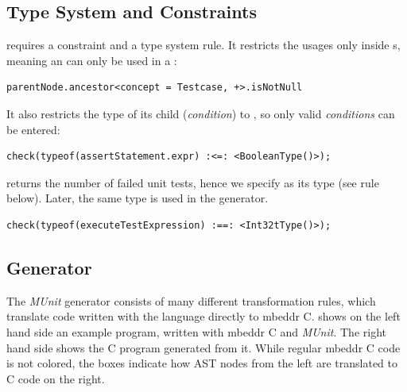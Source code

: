 \subsection{Type System and Constraints}

 requires a constraint and a type
system rule. It restricts the usages only inside s, meaning an
 can only be used in a :
\begin{lstlisting}[language=constraintsAndTS,frame=single]
parentNode.ancestor<concept = Testcase, +>.isNotNull
\end{lstlisting}

It also restricts the type of its child  (\emph{condition}) to
, so only valid \emph{conditions} can be entered:
\begin{lstlisting}[language=constraintsAndTS,frame=single]
check(typeof(assertStatement.expr) :<=: <BooleanType()>);
\end{lstlisting}

 returns the number of failed unit tests,  
hence we specify  as its type (see rule below). Later, the same
type is used in the generator.

\begin{lstlisting}[language=constraintsAndTS,frame=single]
check(typeof(executeTestExpression) :==: <Int32tType()>);
\end{lstlisting}


\subsection{Generator}

The \emph{MUnit} generator consists of many different transformation rules,
which translate code written with the language directly to mbeddr C.  shows
on the left hand side an example program, written with mbeddr C and
\emph{MUnit}. The right hand side shows the C program generated from
it. While regular mbeddr C code is not colored, the boxes indicate how \ac{AST}
nodes from the left are translated to C code on the right.

